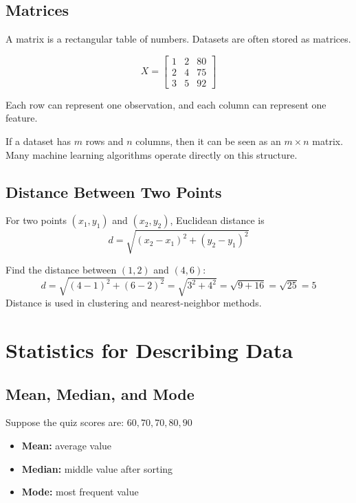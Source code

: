 \documentclass[11pt,a4paper]{article}
\begin{document}
\subsection{Matrices}

A matrix is a rectangular table of numbers. Datasets are often stored as matrices.

\[
X = \begin{bmatrix}
1 & 2 & 80 \\
2 & 4 & 75 \\
3 & 5 & 92
\end{bmatrix}
\]

Each row can represent one observation, and each column can represent one feature.

\begin{conceptbox}
If a dataset has $m$ rows and $n$ columns, then it can be seen as an $m \times n$ matrix. Many machine learning algorithms operate directly on this structure.
\end{conceptbox}

\subsection{Distance Between Two Points}

For two points $(x_1, y_1)$ and $(x_2, y_2)$, Euclidean distance is
\[
d = \sqrt{(x_2 - x_1)^2 + (y_2 - y_1)^2}
\]

\begin{examplebox}
Find the distance between $(1,2)$ and $(4,6)$:
\[
d = \sqrt{(4-1)^2 + (6-2)^2} = \sqrt{3^2 + 4^2} = \sqrt{9 + 16} = \sqrt{25} = 5
\]
Distance is used in clustering and nearest-neighbor methods.
\end{examplebox}

\section{Statistics for Describing Data}

\subsection{Mean, Median, and Mode}

Suppose the quiz scores are: $60, 70, 70, 80, 90$

\begin{itemize}[leftmargin=*]
  \item \textbf{Mean:} average value
  \item \textbf{Median:} middle value after sorting
  \item \textbf{Mode:} most frequent value
\end{itemize}
\end{document}
